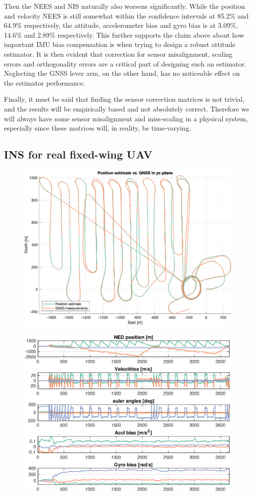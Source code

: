 Then the NEES and NIS naturally also worsens significantly. While the position and velocity NEES is still somewhat within the confidence intervals at 85.2\% and 64.9\% respectively, the attitude, accelerometer bias and gyro bias is at 3.09\%, 14.6\% and 2.89\% respectively. This further supports the claim above about how important IMU bias compensation is when trying to design a robust attitude estimator. It is then evident that correction for sensor misalignment, scaling errors and orthogonality errors are a critical part of designing such an estimator. Neglecting the GNSS lever arm, on the other hand, has no noticeable effect on the estimator performance.

Finally, it must be said that finding the sensor correction matrices is not trivial, and the results will be empirically based and not absolutely correct. Therefore we will always have some sensor misalignment and miss-scaling in a physical system, especially since these matrices will, in reality, be time-varying.

\subsection{INS for real fixed-wing UAV}
\begin{figure}[!htb]
    \centering
    \includegraphics[width=0.6\linewidth]{figures/ga_2/real_trajectory.eps}
    \caption{}
    \label{fig:ga_2_real_trajectory}
\end{figure}

\begin{figure}[!htb]
    \centering
    \includegraphics[width=0.8\linewidth]{figures/ga_2/real_state.eps}
    \caption{}
    \label{fig:ga_2_real_state}
\end{figure}

